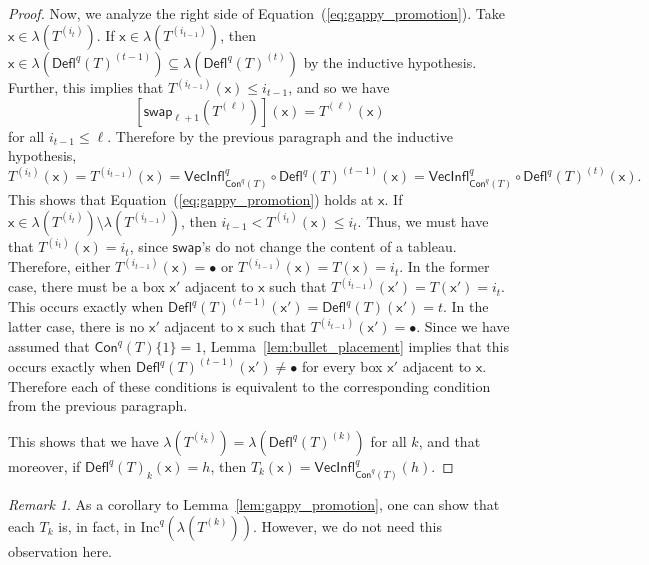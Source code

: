 \documentclass[12pt]{amsart}
\newcommand{\x}{\ensuremath{\mathsf{x}}}
\theoremstyle{definition}
\theoremstyle{remark}
\newtheorem{remark}[theorem]{Remark}
\numberwithin{equation}{section}
\newcommand{\inc}{\ensuremath{\mathrm{Inc}}}
\newcommand{\swap}{\ensuremath{\mathsf{swap}}}
\newcommand{\deflate}{\ensuremath{\mathsf{Defl}}}
\newcommand{\inflate}{\ensuremath{\mathsf{VecInfl}}}
\newcommand{\content}{\ensuremath{\mathsf{Con}}}
\begin{document}
\begin{proof}
Now, we analyze the right side of Equation~(\ref{eq:gappy_promotion}). Take $\x \in \lambda\left( T^{(i_t)} \right)$.   If $\x \in \lambda \left(T^{(i_{t-1})} \right)$, then $\x \in \lambda(\deflate^q(T)^{(t-1)}) \subseteq \lambda(\deflate^q(T)^{(t)})$ by the inductive hypothesis. Further, this implies that $T^{(i_{t-1})}(\x) \leq i_{t-1}$,  and so we have
\[
\left[ \swap_{\ell+1} \left(T^{(\ell)} \right) \right](\x) = T^{(\ell)}(\x)
\]
 for all $i_{t-1} \leq \ell$. Therefore by the previous paragraph and the inductive hypothesis,
 \[ T^{(i_t)}(\x) = T^{(i_{t-1})}(\x) = \inflate^q_{\content^q(T)} \circ \deflate^q(T)^{(t-1)}(\x) =  \inflate^q_{\content^q(T)} \circ \deflate^q(T)^{(t)}(\x). \] This shows that Equation~(\ref{eq:gappy_promotion}) holds at $\x$. If $\x \in \lambda \left(T^{(i_{t})} \right) \setminus \lambda \left(T^{(i_{t-1})} \right)$, then $i_{t-1} < T^{(i_{t})}(\x) \leq i_t$. Thus, we must have that $T^{(i_{t})}(\x) = i_{t}$, since $\swap$'s do not change the content of a tableau. Therefore, either $T^{(i_{t-1})}(\x) = \bullet$ or $T^{(i_{t-1})}(\x) =  T(\x) = i_{t}$. In the former case, there must be a box $\x'$ adjacent to $\x$ such that $T^{(i_{t-1})}(\x') = T(\x') = i_{t}$. This occurs exactly when $\deflate^q(T)^{(t-1)}(\x') = \deflate^q(T)(\x') = t$. In the latter case, there is no $\x'$ adjacent to $\x$ such that $T^{(i_{t-1})}(\x') = \bullet$. Since we have assumed that  $\content^q(T) \lbrace 1 \rbrace = 1$, Lemma~\ref{lem:bullet_placement} implies that this occurs exactly when  $\deflate^q(T)^{(t-1)}(\x') \neq \bullet$ for every box $\x'$ adjacent to $\x$. Therefore each of these conditions is equivalent to the corresponding condition from the previous paragraph. 
 
This shows that we have $\lambda \left(T^{(i_k)} \right) = \lambda \left(\deflate^q(T)^{(k)} \right)$ for all $k$, and that moreover, if $\deflate^q(T)_{k}(\x) = h$, then $T_k(\x) = \inflate^q_{\content^q(T)}(h)$. 
\end{proof}

\begin{remark}
As a corollary to Lemma~\ref{lem:gappy_promotion}, one can show that each $T_k$ is, in fact, in $\inc^q \left(\lambda \left( T^{(k)} \right) \right)$. However, we do not need this observation here.
\end{remark}
\end{document}
